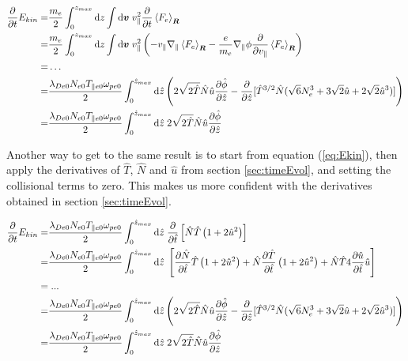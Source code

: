 \documentclass[final]{jpp}
\begin{document}
\begin{align}
    \frac{\partial}{\partial t} E_{kin} =& \frac{m_e}{2} \int_0^{z_{max}}{\rm d}z \int{\rm d}\bm{v} \; v_{\parallel}^2  \frac{\partial}{\partial t} \left< F_e \right>_{\bm{R}} \nonumber \\
    =& \frac{m_e}{2} \int_0^{z_{max}}{\rm d}z \int{\rm d}\bm{v} \; v_{\parallel}^2  \left( -v_\parallel \nabla_\parallel \left< F_e \right>_{\bm{R}} - \frac{e}{m_e} \nabla_\parallel \phi \frac{\partial }{ \partial v_{\parallel}} \left< F_e \right>_{\bm{R}} \right) \nonumber \\
    =&\dots  \nonumber \\
    =& \frac{\lambda_{De0} N_{e0} T_{\parallel e 0}\omega_{pe0}}{2} \int_0^{\hat{z}_{max}}{\rm d}\hat{z}  \left( 2\sqrt{2\hat{T}}\hat{N}\hat{u}  \frac{\partial \hat{\phi}}{\partial \hat{z} }  -  \frac{\partial}{\partial \hat{z}}[ \hat{T}^{3/2}\hat{N}(\sqrt{6}N_e^3+3\sqrt{2}\hat{u}+2\sqrt{2}\hat{u}^3) ]  \right)  \nonumber \\
    =& \frac{\lambda_{De0} N_{e0} T_{\parallel e 0}\omega_{pe0}}{2} \int_0^{\hat{z}_{max}}{\rm d}\hat{z} \; 2\sqrt{2\hat{T}}\hat{N}\hat{u}  \frac{\partial \hat{\phi}}{\partial \hat{z} } 
\end{align}{}

Another way to get to the same result is to start from equation (\ref{eq:Ekin}), then apply the derivatives of $ \hat T$, $ \hat N$ and $\hat u$ from section \ref{sec:timeEvol}, and setting the collisional terms to zero. This makes us more confident with the derivatives obtained in section \ref{sec:timeEvol}.

\begin{align}
    \frac{\partial}{\partial t} E_{kin} =& \frac{\lambda_{De0} N_{e0} T_{\parallel e 0}\omega_{pe0}}{2} \int_0^{\hat{z}_{max}}{\rm d}\hat{z}\; \frac{\partial }{\partial \hat{t}} \left[ \hat{N} \hat{T} \left( 1 + 2\hat{u}^2 \right)\right] \nonumber \\
    =& \frac{\lambda_{De0} N_{e0} T_{\parallel e 0}\omega_{pe0}}{2} \int_0^{\hat{z}_{max}}{\rm d}\hat{z}\; \left[ \frac{\partial \hat{N}}{\partial \hat{t}} \hat{T} \left( 1 + 2\hat{u}^2 \right)  +  \hat{N} \frac{\partial \hat{T}}{\partial \hat{t}} \left( 1 + 2\hat{u}^2 \right) +\hat{N} \hat{T} 4 \frac{\partial \hat{u}}{\partial \hat{t}} \hat{u}  \right] \nonumber\\
    =& \;... \nonumber\\
    =& \frac{\lambda_{De0} N_{e0} T_{\parallel e 0}\omega_{pe0}}{2} \int_0^{\hat{z}_{max}}{\rm d}\hat{z}  \left( 2\sqrt{2\hat{T}}\hat{N}\hat{u}  \frac{\partial \hat{\phi}}{\partial \hat{z} }  -  \frac{\partial}{\partial \hat{z}}[ \hat{T}^{3/2}\hat{N}(\sqrt{6}N_e^3+3\sqrt{2}\hat{u}+2\sqrt{2}\hat{u}^3) ]  \right)  \nonumber \\
    =& \frac{\lambda_{De0} N_{e0} T_{\parallel e 0}\omega_{pe0}}{2} \int_0^{\hat{z}_{max}}{\rm d}\hat{z} \; 2\sqrt{2\hat{T}}\hat{N}\hat{u}  \frac{\partial \hat{\phi}}{\partial \hat{z} }    \label{eq:dEkin/dt}
\end{align}{}
\end{document}
